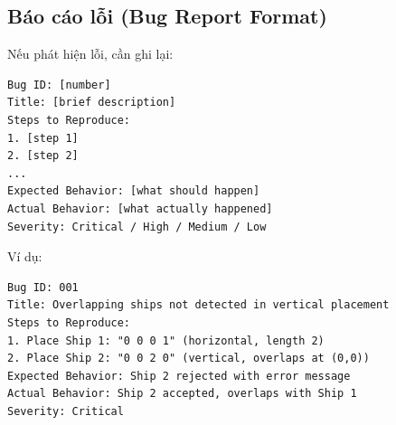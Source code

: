 \subsection{Báo cáo lỗi (Bug Report Format)}

Nếu phát hiện lỗi, cần ghi lại:

\begin{verbatim}
Bug ID: [number]
Title: [brief description]
Steps to Reproduce:
1. [step 1]
2. [step 2]
...
Expected Behavior: [what should happen]
Actual Behavior: [what actually happened]
Severity: Critical / High / Medium / Low
\end{verbatim}

Ví dụ:

\begin{verbatim}
Bug ID: 001
Title: Overlapping ships not detected in vertical placement
Steps to Reproduce:
1. Place Ship 1: "0 0 0 1" (horizontal, length 2)
2. Place Ship 2: "0 0 2 0" (vertical, overlaps at (0,0))
Expected Behavior: Ship 2 rejected with error message
Actual Behavior: Ship 2 accepted, overlaps with Ship 1
Severity: Critical
\end{verbatim}
